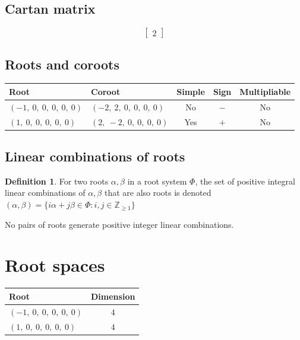 \documentclass[11pt]{article}
\theoremstyle{definition}
\newtheorem{definition}{Definition}[section]
\begin{document}
\subsection{Cartan matrix}
\[
\left[\begin{matrix}2\end{matrix}\right]
\]

\subsection{Roots and coroots}
\begin{center}
\begin{tabular}{|l|l|c|c|c|}
    \hline
    \textbf{Root} & \textbf{Coroot} & \textbf{Simple} & \textbf{Sign} & \textbf{Multipliable} \\
    \hline
    $\left( -1, \  0, \  0, \  0, \  0, \  0\right)$ & $\left( -2, \  2, \  0, \  0, \  0, \  0\right)$ & No & $-$ & No \\
    \hline
    $\left( 1, \  0, \  0, \  0, \  0, \  0\right)$ & $\left( 2, \  -2, \  0, \  0, \  0, \  0\right)$ & Yes & $+$ & No \\
    \hline
\end{tabular}
\end{center}


\subsection{Linear combinations of roots}

\begin{definition}
For two roots $\alpha, \beta$ in a root system $\Phi$, the set of positive integral linear combinations of $\alpha, \beta$ that are also roots is denoted
\(
	(\alpha, \beta) = \{ i \alpha + j \beta \in \Phi : i, j \in \mathbb{Z}_{\ge 1} \}
\)
\end{definition}

\noindent No pairs of roots generate positive integer linear combinations.


\section{Root spaces}

\begin{center}
\begin{tabular}{|l|c|}
\hline
Root & Dimension \\
\hline
$\left( -1, \  0, \  0, \  0, \  0, \  0\right)$ & $4$ \\
\hline
$\left( 1, \  0, \  0, \  0, \  0, \  0\right)$ & $4$ \\
\hline
\end{tabular}\end{center}
\end{document}
